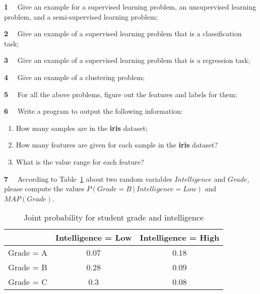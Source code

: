 \newpage 
{}

\begin{newquestion}{\textbf{1}~~}
 Give an example for a supervised learning problem, an unsupervised learning problem, and a semi-supervised learning problem; 
\end{newquestion}

\begin{newquestion}{\textbf{2}~~}
Give an example of a supervised learning problem that is a classification task; 
\end{newquestion}

\begin{newquestion}{\textbf{3}~~}
Give an example of a supervised learning problem that is a regression task;
\end{newquestion}

\begin{newquestion}{\textbf{4}~~}
Give an example of a clustering problem;
\end{newquestion}

\begin{newquestion}{\textbf{5}~~}
For all the above problems, figure out the features and labels for them;
\end{newquestion}

\begin{newquestion}{\textbf{6}~~}
Write a program to output the following information: 
    \begin{enumerate}
        \item How many samples are in the \textbf{iris} dataset;
        \item How many features are given for each sample in the \textbf{iris} dataset? 
        \item What is the value range for each feature? 
    \end{enumerate}
\end{newquestion}

\begin{newquestion}{\textbf{7}~~}
According to Table~\ref{fig:probability} about two random variables $Intelligence$ and $Grade$, 
    please compute the values    
$
P(Grade = B ~|~ Intelligence = Low) 
$
and 
$
MAP(Grade) 
$.
\begin{table}[h!]
    \centering
    \begin{tabular}{|c|c|c|}
    \hline
         & Intelligence = Low & Intelligence = High \\
         \hline
       Grade = A  & 0.07 & 0.18 \\
       \hline
       Grade = B & 0.28 & 0.09 \\
       \hline
       Grade = C & 0.3 & 0.08 \\
    \hline
    \end{tabular}
    \caption{Joint probability for student grade and intelligence}
    \label{fig:probability}
\end{table}
\end{newquestion}



